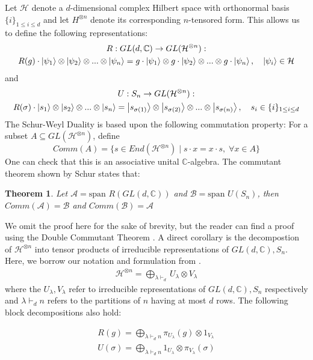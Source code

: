 \documentclass[12pt]{article}%
\newtheorem{thm}{Theorem}
\begin{document}
Let $\mathcal{H}$ denote a $d$-dimensional complex Hilbert space with orthonormal basis $\{i\}_{1 \leq i \leq d}$ and let $H^{\otimes n}$ denote its corresponding $n$-tensored form.
This allows us to define the following representations:
\begin{gather*}
  R: GL(d,\mathbb{C}) \rightarrow GL(\mathcal{H}^{\otimes n}): \\
  R(g) \cdot \ket{\psi_1} \otimes \ket{\psi_2} \otimes ... \otimes \ket{\psi_n} = g \cdot \ket{\psi_1} \otimes g \cdot \ket{\psi_2} \otimes ... \otimes g \cdot \ket{\psi_n}, \quad \ket{\psi_i} \in \mathcal{H}
\end{gather*}
and
\begin{gather*}
  U: S_n \rightarrow GL(\mathcal{H}^{\otimes n}): \\
  R(\sigma) \cdot \ket{s_1} \otimes \ket{s_2} \otimes ... \otimes \ket{s_n} = \ket{s_{\sigma(1)}} \otimes \ket{s_{\sigma(2)}} \otimes ... \otimes  \ket{s_{\sigma(n)}}, \quad s_i \in \{i\}_{1 \leq i \leq d}
\end{gather*}
The Schur-Weyl Duality is based upon the following commutation property: For a subset $A \subseteq GL(\mathcal{H}^{\otimes n})$, define
$$ Comm(A) = \{s \in End(\mathcal{H}^{\otimes n})\mid s \cdot x = x \cdot s, \; \forall x \in A \} $$
One can check that this is an associative unital $\mathbb{C}$-algebra. The commutant theorem shown by Schur states that:
\begin{thm}
  Let $\mathcal{A} = \text{span }{R(GL(d,\mathbb{C}))}$ and $\mathcal{B} = \text{span }U(S_n)$, then $Comm(\mathcal{A}) = \mathcal{B}$ and $Comm(\mathcal{B}) = \mathcal{A}$
\end{thm}

\noindent We omit the proof here for the sake of brevity, but the reader can find a proof using the Double Commutant Theorem \cite{GW}. A direct corollary is the decompostion of $\mathcal{H}^{\otimes n}$ into tensor products of irreducible representations of $GL(d,\mathbb{C}), S_n$. Here, we borrow our notation and formulation from \cite{botero}.
\begin{gather}
  \mathcal{H}^{\otimes n} = \bigoplus_{\lambda \vdash_d } U_\lambda \otimes V_\lambda
\end{gather}
where the $U_\lambda, V_\lambda$ refer to irreducible representations of $GL(d, \mathbb{C}), S_n$ respectively and $\lambda \vdash_d n$ refers to the partitions of $n$ having at most $d$ rows. The following block decompositions also hold:

\begin{gather}\label{matdecomp}
    R(g) = \bigoplus_{\lambda \vdash_d n} \pi_{U_{\lambda}}(g) \otimes 1_{V_{\lambda}} \\
    U(\sigma) = \bigoplus_{\lambda \vdash_d n} 1_{U_{\lambda}} \otimes \pi_{V_{\lambda}}(\sigma)
\end{gather}
\end{document}
